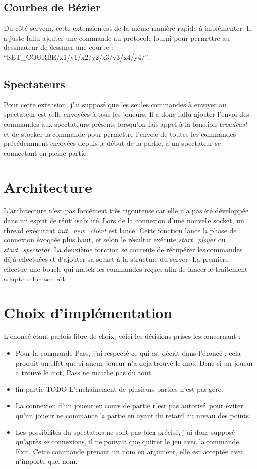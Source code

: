 \documentclass[a4paper, 11pt]{report}
\begin{document}
\subsection{Courbes de Bézier}

Du côté serveur, cette extension est de la même manière rapide à
implémenter.
Il a juste fallu ajouter une commande au protocole fourni pour
permettre au dessinateur de dessiner une courbe : ``SET\_COURBE/x1/y1/x2/y2/x3/y3/x4/y4/''. 

\subsection{Spectateurs}

Pour cette extension, j'ai supposé que les seules commandes à envoyer
au spectateur est celle envoyées à tous les joueurs. Il a donc fallu
ajouter l'envoi des commandes aux spectateurs présents lorsqu'on fait
appel à la fonction \emph{broadcast} et de stocker la commande pour
permettre l'envoie de toutes les commandes précédemment envoyées
depuis le début de la partie, à un spectateur se connectant en pleine
partie



\section{Architecture}

L'architecture n'est pas forcément très rigoureuse car elle n'a pas
été développée dans un esprit de réutilisabilité. Lors de la connexion
d'une nouvelle socket, un thread exécutant \emph{init\_new\_client}
est lancé. Cette fonction lance la phase de connexion évoquée plus
haut, et selon le résultat exécute \emph{start\_player} ou
\emph{start\_spectator}. La deuxième fonction se contente de récupérer 
les commandes déjà effectuées et d'ajouter sa socket à la structure du
server. La première effectue une boucle qui match les commandes reçues
afin de lancer le traitement adapté selon son rôle.

\section{Choix d'implémentation}
L'énoncé étant parfois libre de choix, voici les décisions prises les
concernant :
 \begin{itemize}
\item Pour la commande Pass, j'ai respecté ce qui est décrit dans
  l'énoncé : cela produit un effet que si aucun joueur n'a deja trouvé
  le mot. Donc si un joueur a trouvé le mot, Pass ne marche pas du tout.
\item fin partie TODO L'enchaînement de plusieurs parties n'est pas géré.
\item La connexion d'un joueur en cours de partie n'est pas autorisé,
  pour éviter qu'un joueur ne commance la partie en ayant du retard au
  niveau des points. 
\item Les possibilités du spectators ne sont pas bien précisé, j'ai
  donc supposé qu'après se connexions, il ne pouvait que quitter le
  jeu avec la commande Exit. Cette commande prenant un nom en
  argument, elle est acceptée avec n'importe quel nom.
\end{itemize}
\end{document}
